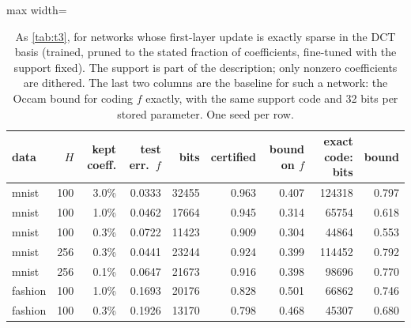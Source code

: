 \begin{table}[t]
\centering\small
\begin{adjustbox}{max width=\linewidth}\begin{tabular}{l r r r r r r r r}
\toprule
data & $H$ & kept coeff. & test err.\ $f$ & bits & certified & bound on $f$ & exact code: bits & bound \\
\midrule
mnist & 100 & 3.0\% & 0.0333 & 32455 & 0.963 & 0.407 & 124318 & 0.797 \\
mnist & 100 & 1.0\% & 0.0462 & 17664 & 0.945 & 0.314 & 65754 & 0.618 \\
mnist & 100 & 0.3\% & 0.0722 & 11423 & 0.909 & 0.304 & 44864 & 0.553 \\
mnist & 256 & 0.3\% & 0.0441 & 23244 & 0.924 & 0.399 & 114452 & 0.792 \\
mnist & 256 & 0.1\% & 0.0647 & 21673 & 0.916 & 0.398 & 98696 & 0.770 \\
fashion & 100 & 1.0\% & 0.1693 & 20176 & 0.828 & 0.501 & 66862 & 0.746 \\
fashion & 100 & 0.3\% & 0.1926 & 13170 & 0.798 & 0.468 & 45307 & 0.680 \\
\bottomrule
\end{tabular}\end{adjustbox}
\caption{As \cref{tab:t3}, for networks whose first-layer update is exactly sparse in the DCT basis (trained, pruned to the stated fraction of coefficients, fine-tuned with the support fixed). The support is part of the description; only nonzero coefficients are dithered. The last two columns are the baseline for such a network: the Occam bound for coding $f$ exactly, with the same support code and 32 bits per stored parameter. One seed per row.}\label{tab:t3sparse}
\end{table}
